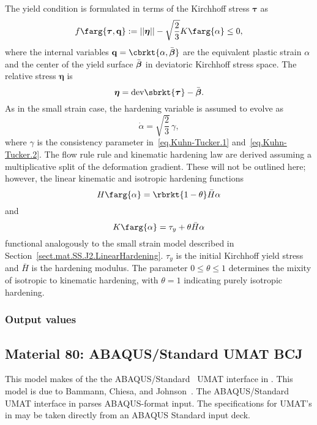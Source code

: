 The yield condition is formulated in terms of the
Kirchhoff stress $\boldsymbol{\tau}$ as
\begin{equation}
	f\farg{\boldsymbol{\tau}, \mathbf{q}} := 
	||\boldsymbol{\eta}|| 
	- \sqrt{\frac{2}{3}} K\farg{\alpha} \le 0,
\end{equation}
where the internal variables 
$\mathbf{q} = \cbrkt{\alpha, \bar{\boldsymbol{\beta}}}$ are
the equivalent plastic strain $\alpha$ and the center of
the yield surface $\Bar{\boldsymbol{\beta}}$ in deviatoric
Kirchhoff stress space. The relative stress $\boldsymbol{\eta}$ is
\begin{equation}
\boldsymbol{\eta} = \textrm{dev}\sbrkt{\boldsymbol\tau} - 
\bar{\boldsymbol{\beta}}.
\end{equation}
As in the small strain case, the hardening variable is assumed
to evolve as
\begin{equation}
\dot{\alpha} = \sqrt{\frac{2}{3}}\,\gamma,	
\end{equation}
where $\gamma$ is the consistency parameter 
in~\eqref{eq.Kuhn-Tucker.1} and~\eqref{eq.Kuhn-Tucker.2}.
The flow rule rule and kinematic hardening law are derived
assuming a multiplicative split of the deformation gradient.
These will not be outlined here; however,
the linear kinematic and isotropic hardening functions
\begin{equation}
	H\farg{\alpha} = \rbrkt{1 - \theta} \bar{H} \alpha
\end{equation}
and
\begin{equation}
	K\farg{\alpha} = \tau_{y} + \theta \bar{H} \alpha
\end{equation}
functional analogously to the small strain model described
in Section~\ref{sect.mat.SS.J2.LinearHardening}.
$\tau_{y}$ is the initial Kirchhoff yield stress and
$\bar{H}$ is the hardening modulus.
The parameter $0 \le \theta \le 1$ determines the mixity of 
isotropic to kinematic hardening, with $\theta = 1$ indicating purely 
isotropic hardening.

\subsubsection{Output values}

\setcounter{subsection}{79}
\subsection{Material 80: \textsf{ABAQUS/Standard UMAT} BCJ}
\label{sect.mat.ABAQUS.BCJ}
This model makes of the the \textsf{ABAQUS/Standard}~\cite{ABAQUSv56}
\textsf{UMAT} interface in \tahoe. This model is due to Bammann, 
Chiesa, and Johnson~\cite{BammannNNNN}.
The \textsf{ABAQUS/Standard UMAT} interface in \tahoe parses
\textsf{ABAQUS}-format input. The specifications for
\textsf{UMAT}'s in \tahoe may be taken directly from an
\textsf{ABAQUS Standard} input deck.

